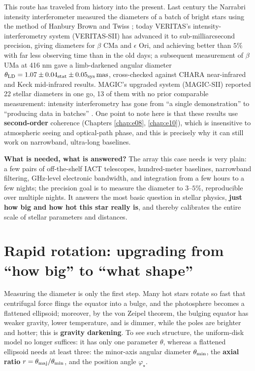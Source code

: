 This route has traveled from history into the present. Last century the Narrabri intensity interferometer measured the diameters of a batch of bright stars using the method of Hanbury Brown and Twiss \citep{1956Natur.178.1046H,1974MNRAS.167..121H}; today VERITAS's intensity-interferometry system (VERITAS-SII) has advanced it to sub-milliarcsecond precision, giving diameters for \(\beta\) CMa and \(\epsilon\) Ori, and achieving better than \(5\%\) with far less observing time than in the old days; a subsequent measurement of \(\beta\) UMa at 416 nm gave a limb-darkened angular diameter \(\theta_{\rm LD}=1.07\pm0.04_{\rm stat}\pm0.05_{\rm sys}\,\mathrm{mas}\), cross-checked against CHARA near-infrared and Keck mid-infrared results. MAGIC's upgraded system (MAGIC-SII) reported 22 stellar diameters in one go, 13 of them with no prior comparable measurement: intensity interferometry has gone from ``a single demonstration'' to ``producing data in batches'' \citep{2020NatAs...4.1164A,2024ApJ...966...28A,2024MNRAS.529.4387A}. One point to note here is that these results use \textbf{second-order} coherence (Chapters \ref{chap:e08}, \ref{chap:e10}), which is insensitive to atmospheric seeing and optical-path phase, and this is precisely why it can still work on narrowband, ultra-long baselines.

\textbf{What is needed, what is answered?} The array this case needs is very plain: a few pairs of off-the-shelf IACT telescopes, hundred-meter baselines, narrowband filtering, GHz-level electronic bandwidth, and integration from a few hours to a few nights; the precision goal is to measure the diameter to \(3\text{--}5\%\), reproducible over multiple nights. It answers the most basic question in stellar physics, \textbf{just how big and how hot this star really is}, and thereby calibrates the entire scale of stellar parameters and distances.

\section{Rapid rotation: upgrading from ``how big'' to ``what shape''}
\label{sec:e25-rotation}

Measuring the diameter is only the first step. Many hot stars rotate so fast that centrifugal force flings the equator into a bulge, and the photosphere becomes a flattened ellipsoid; moreover, by the von Zeipel theorem, the bulging equator has weaker gravity, lower temperature, and is dimmer, while the poles are brighter and hotter; this is \textbf{gravity darkening}. To see such structure, the uniform-disk model no longer suffices: it has only one parameter \(\theta\), whereas a flattened ellipsoid needs at least three: the minor-axis angular diameter \(\theta_{\rm min}\), the \textbf{axial ratio} \(r=\theta_{\rm maj}/\theta_{\rm min}\), and the position angle \(\varphi_\star\).

